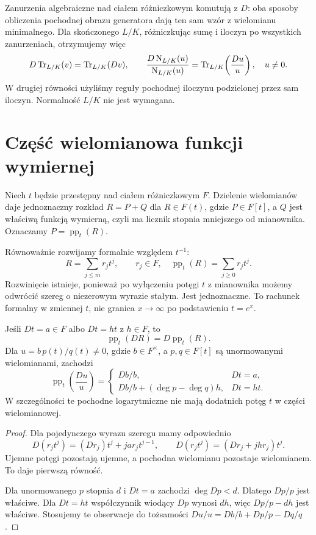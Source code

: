 Zanurzenia algebraiczne nad ciałem różniczkowym komutują z $D$: oba sposoby obliczenia pochodnej obrazu generatora dają ten sam wzór z wielomianu minimalnego. Dla skończonego $L/K$, różniczkując sumę i iloczyn po wszystkich zanurzeniach, otrzymujemy więc
\begin{equation}\label{eq:trace-norm}
D\operatorname{Tr}_{L/K}(v)=\operatorname{Tr}_{L/K}(Dv),\qquad
\frac{D\operatorname{N}_{L/K}(u)}{\operatorname{N}_{L/K}(u)}
=\operatorname{Tr}_{L/K}\!\left(\frac{Du}{u}\right),\quad u\ne0.
\end{equation}
W drugiej równości użyliśmy reguły pochodnej iloczynu podzielonej przez sam iloczyn. Normalność $L/K$ nie jest wymagana.

\section{Część wielomianowa funkcji wymiernej}

Niech $t$ będzie przestępny nad ciałem różniczkowym $F$. Dzielenie wielomianów daje jednoznaczny rozkład $R=P+Q$ dla $R\in F(t)$, gdzie $P\in F[t]$, a $Q$ jest właściwą funkcją wymierną, czyli ma licznik stopnia mniejszego od mianownika. Oznaczamy $P=\operatorname{pp}_t(R)$.

Równoważnie rozwijamy formalnie względem $t^{-1}$:
\[
R=\sum_{j\le m}r_jt^j,\qquad r_j\in F,\quad
\operatorname{pp}_t(R)=\sum_{j\ge0}r_jt^j.
\]
Rozwinięcie istnieje, ponieważ po wyłączeniu potęgi $t$ z mianownika możemy odwrócić szereg o niezerowym wyrazie stałym. Jest jednoznaczne. To rachunek formalny w zmiennej $t$, nie granica $x\to\infty$ po podstawieniu $t=e^x$.

\begin{lemat}
Jeśli $Dt=a\in F$ albo $Dt=ht$ z $h\in F$, to
\[
\operatorname{pp}_t(DR)=D\operatorname{pp}_t(R).
\]
Dla $u=b\,p(t)/q(t)\ne0$, gdzie $b\in F^\times$, a $p,q\in F[t]$ są unormowanymi wielomianami, zachodzi
\[
\operatorname{pp}_t\left(\frac{Du}{u}\right)=
\begin{cases}
Db/b, & Dt=a,\\
Db/b+(\deg p-\deg q)h, & Dt=ht.
\end{cases}
\]
W szczególności te pochodne logarytmiczne nie mają dodatnich potęg $t$ w części wielomianowej.
\end{lemat}
\begin{proof}
Dla pojedynczego wyrazu szeregu mamy odpowiednio
\[
D(r_jt^j)=(Dr_j)t^j+j a r_jt^{j-1},\qquad
D(r_jt^j)=(Dr_j+jhr_j)t^j.
\]
Ujemne potęgi pozostają ujemne, a pochodna wielomianu pozostaje wielomianem. To daje pierwszą równość.

Dla unormowanego $p$ stopnia $d$ i $Dt=a$ zachodzi $\deg Dp<d$. Dlatego $Dp/p$ jest właściwe. Dla $Dt=ht$ współczynnik wiodący $Dp$ wynosi $dh$, więc $Dp/p-dh$ jest właściwe. Stosujemy te obserwacje do tożsamości $Du/u=Db/b+Dp/p-Dq/q$.
\end{proof}

